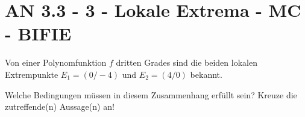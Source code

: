 \section{AN 3.3 - 3 - Lokale Extrema - MC - BIFIE}

\begin{beispiel}[AN 3.3]{1} %
				Von einer Polynomfunktion $f$ dritten Grades sind die beiden lokalen Extrempunkte $E_1=(0/-4)$ und $E_2=(4/0)$ bekannt.

Welche Bedingungen müssen in diesem Zusammenhang erfüllt sein? Kreuze die zutreffende(n) Aussage(n) an!

\end{beispiel}